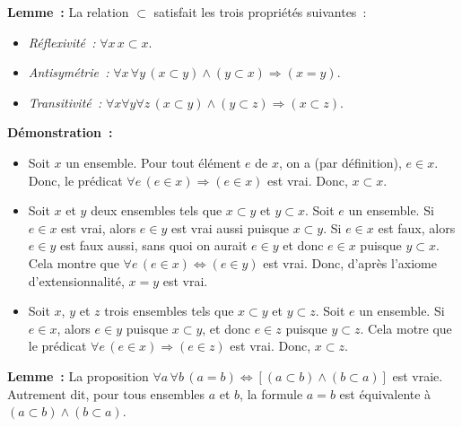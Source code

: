 \medskip

\noindent \textbf{Lemme :} La relation $\subset$ satisfait les trois propriétés suivantes : 
\begin{itemize}[nosep]
    \item \textit{Réflexivité :} $\forall x \, x \subset x$.
    \item \textit{Antisymétrie :} $\forall x \, \forall y \, (x \subset y) \wedge (y \subset x) \Rightarrow (x = y)$.
    \item \textit{Transitivité :} $\forall x \forall y \forall z \, (x \subset y) \wedge (y \subset z) \Rightarrow (x \subset z)$.
\end{itemize}

\medskip

\noindent \textbf{Démonstration :} 
\begin{itemize}[nosep]
    \item Soit $x$ un ensemble. Pour tout élément $e$ de $x$, on a (par définition), $e \in x$. 
        Donc, le prédicat $\forall e \, (e \in x) \Rightarrow (e \in x)$ est vrai.
        Donc, $x \subset x$.
    \item Soit $x$ et $y$ deux ensembles tels que $x \subset y$ et $y \subset x$.
        Soit $e$ un ensemble. 
        Si $e \in x$ est vrai, alors $e \in y$ est vrai aussi puisque $x \subset y$.
        Si $e \in x$ est faux, alors $e \in y$ est faux aussi, sans quoi on aurait $e \in y$ et donc $e \in x$ puisque $y \subset x$.
        Cela montre que $\forall e \, (e \in x) \Leftrightarrow (e \in y)$ est vrai. 
        Donc, d'après l'axiome d'extensionnalité, $x = y$ est vrai.
    \item Soit $x$, $y$ et $z$ trois ensembles tels que $x \subset y$ et $y \subset z$. 
        Soit $e$ un ensemble. 
        Si $e \in x$, alors $e \in y$ puisque $x \subset y$, et donc $e \in z$ puisque $y \subset z$. 
        Cela motre que le prédicat $\forall e \, (e \in x) \Rightarrow (e \in z)$ est vrai.
        Donc, $x \subset z$.
\end{itemize}

\done

\medskip

\noindent\textbf{Lemme :} La proposition $\forall a \, \forall b \, (a = b) \Leftrightarrow [(a \subset b) \wedge (b \subset a)]$ est vraie.
    Autrement dit, pour tous ensembles $a$ et $b$, la formule $a = b$ est équivalente à $(a \subset b) \wedge (b \subset a)$.

\medskip

